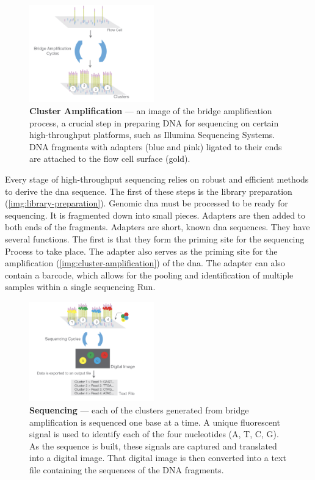 \begin{figure}
  \centering
  \includegraphics[width=0.48\textwidth]{resources/images/Cluster Amplification.png}
  \caption{\textbf{Cluster Amplification} \cite{Illumina2017-CA} — an image of the bridge amplification process, a crucial step in preparing DNA for sequencing on certain high-throughput platforms, such as Illumina Sequencing Systems. DNA fragments with adapters (blue and pink) ligated to their ends are attached to the flow cell surface (gold).}
  \label{img:cluster-amplification}
\end{figure}

Every stage of high-throughput sequencing relies on robust and efficient methods to derive the \gls{dna} sequence. The first of these steps is the library preparation (\autoref{img:library-preparation}). Genomic \gls{dna} must be processed to be ready for \gls{sequencing}. It is fragmented down into small pieces. Adapters are then added to both ends of the fragments. Adapters are short, known \gls{dna} sequences. They have several functions. The first is that they form the priming site for the \gls{sequencing} Process to take place. The adapter also serves as the priming site for the amplification (\autoref{img:cluster-amplification}) of the \gls{dna}. The adapter can also contain a barcode, which allows for the pooling and identification of multiple samples within a single \gls{sequencing} Run.

\begin{figure}
  \centering
  \includegraphics[width=0.48\textwidth]{resources/images/Sequencing.png}
  \caption{\textbf{Sequencing} \cite{Illumina2017-S} — each of the clusters generated from bridge amplification is sequenced one base at a time. A unique fluorescent signal is used to identify each of the four nucleotides (A, T, C, G). As the sequence is built, these signals are captured and translated into a digital image. That digital image is then converted into a text file containing the sequences of the DNA fragments.}
  \label{img:sequencing}
\end{figure}


